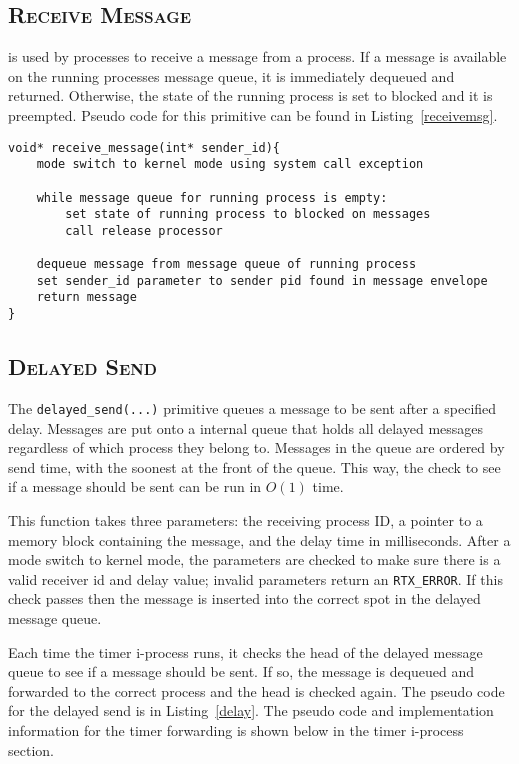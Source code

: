 \documentclass[oneside]{report}
\begin{document}
\subsection{\textsc{Receive Message}}

 is used by processes to receive a message
from a process. If a message is available on the running processes
message queue, it is immediately dequeued and returned. Otherwise, the
state of the running process is set to blocked and it is
preempted. Pseudo code for this primitive can be found in
Listing~\ref{receivemsg}.

\begin{lstlisting}
void* receive_message(int* sender_id){
    mode switch to kernel mode using system call exception

    while message queue for running process is empty:
        set state of running process to blocked on messages
        call release processor

    dequeue message from message queue of running process
    set sender_id parameter to sender pid found in message envelope
    return message
}
\end{lstlisting}

\subsection{\textsc{Delayed Send}}
The \texttt{delayed\_send(...)} primitive queues a message to be sent
after a specified delay. Messages are put onto a internal queue that
holds all delayed messages regardless of which process they belong to.
Messages in the queue are ordered by send time, with the soonest at
the front of the queue. This way, the check to see if a message should
be sent can be run in $O(1)$ time.

This function takes three parameters: the receiving process ID, a
pointer to a memory block containing the message, and the delay time
in milliseconds. After a mode switch to kernel mode, the parameters
are checked to make sure there is a valid receiver id and delay value;
invalid parameters return an \texttt{RTX\_ERROR}. If this check passes
then the message is inserted into the correct spot in the delayed
message queue.

Each time the timer i-process runs, it checks the head of the delayed
message queue to see if a message should be sent. If so, the message
is dequeued and forwarded to the correct process and the head is
checked again. The pseudo code for the delayed send is in
Listing~\ref{delay}. The pseudo code and implementation information
for the timer forwarding is shown below in the timer i-process
section.
\end{document}
